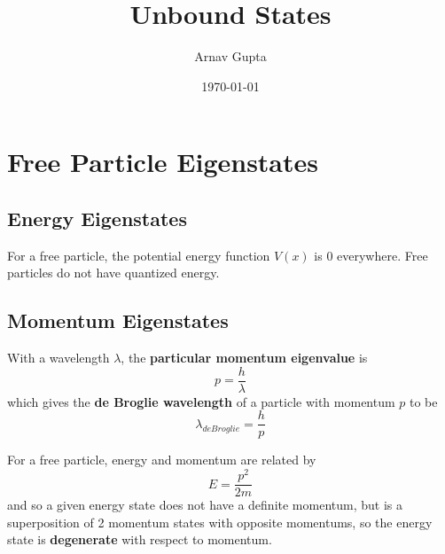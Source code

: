 \documentclass[11pt]{article}
\author{Arnav Gupta}
\date{\today}
\title{Unbound States}
\begin{document}
\maketitle
\tableofcontents

\section{Free Particle Eigenstates}
\label{sec:org2904a4b}
\subsection{Energy Eigenstates}
\label{sec:org2a5a200}
For a free particle, the potential energy function \(V(x)\) is 0 everywhere.
Free particles do not have quantized energy.
\subsection{Momentum Eigenstates}
\label{sec:org484cd38}
With a wavelength \(\lambda\), the \textbf{particular momentum eigenvalue} is
$$
p = \frac{h}{\lambda}
$$
which gives the \textbf{de Broglie wavelength} of a particle with momentum \(p\) to be
$$
\lambda_{de Broglie} = \frac{h}{p}
$$

For a free particle, energy and momentum are related by
$$
E = \frac{p^{2}}{2m}
$$
and so a given energy state does not have a definite momentum, but is a superposition of
2 momentum states with opposite momentums, so the energy state is \textbf{degenerate} with respect to
momentum.
\end{document}
